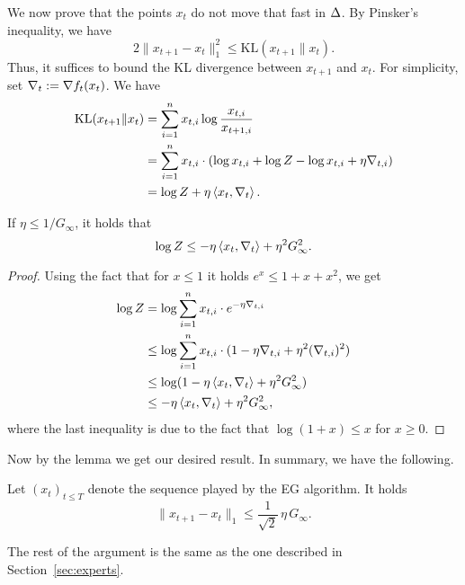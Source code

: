 We now prove that the points $x_t$ do not move that fast in $\Delta$. By Pinsker's inequality, we have
\[
    2\|x_{t+1} - x_t\|_1^2 \leq \mathrm{KL}(x_{t+1}\|x_t).
\]
Thus, it suffices to bound the KL divergence between $x_{t+1}$ and $x_t$. For simplicity, set $\nabla_t := \nabla f_t(x_t)$. We have
\begin{align*}
    \mathrm{KL}(x_{t+1}\|x_t) &= \sum_{i=1}^n x_{t,i} \log\frac{x_{t,i}}{x_{{t+1},i}} \\
                              &= \sum_{i=1}^n x_{t,i} \cdot (\log x_{t,i} + \log Z - \log x_{t,i} + \eta \nabla_{t,i}) \\
                              &= \log Z + \eta \left\langle x_t,\nabla_t \right\rangle.
\end{align*}
\begin{lemma}
    If $\eta \leq 1/G_\infty$, it holds that
    \[
        \log Z \leq -\eta\left\langle x_t,\nabla_t \right\rangle + \eta^2 G_\infty^2.
    \]
\end{lemma}
\begin{proof}
    Using the fact that for $x \leq 1$ it holds $e^x \leq 1 + x + x^2$, we get
    \begin{align*}
        \log Z &= \log \sum_{i=1}^n x_{t,i} \cdot e^{-\eta \nabla_{t,i}} \\
               &\leq \log \sum_{i=1}^n x_{t,i}\cdot (1 - \eta\nabla_{t,i} + \eta^2(\nabla_{t,i})^2) \\
               &\leq \log (1 - \eta\left\langle x_t,\nabla_t \right\rangle + \eta^2G_\infty^2) \\
               &\leq - \eta\left\langle x_t,\nabla_t \right\rangle + \eta^2G_\infty^2,
    \end{align*}
    where the last inequality is due to the fact that $\log (1+x) \leq x$ for $x \geq 0$.
\end{proof}

Now by the lemma we get our desired result. In summary, we have the following.
\begin{proposition}
    Let $(x_t)_{t\leq T}$ denote the sequence played by the EG algorithm. It holds
    \[
        \|x_{t+1} - x_t\|_1 \leq \frac{1}{\sqrt{2}}\,\eta\, G_\infty.
    \]
\end{proposition}

The rest of the argument is the same as the one described in Section~\ref{sec:experts}.

